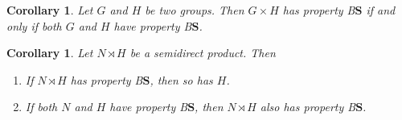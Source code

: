 \documentclass[a4paper]{article}
\newcommand{\PH}[1]{\todo[color={blue!33},size=small]{#1}}
\newtheorem{cor}[lem]{Corollary}
\theoremstyle{definition}
\newcommand*{\BS}{B$\mathbf{S}$}
\begin{document}
%
%
%
%
%
%
\begin{cor}\label{Cor:Prod}
Let $G$ and $H$ be two groups. Then $G\times H$ has property \BS{} if and only if both $G$ and $H$ have property \BS.
\end{cor}
%
%
\begin{cor}\label{Cor:Semidirect}
Let $N\rtimes H$ be a semidirect product. Then
\begin{enumerate}
\item
If $N\rtimes H$ has property \BS, then so has $H$.
\item
If both $N$ and $H$ have property \BS, then $N\rtimes H$ also has property \BS.
\end{enumerate}
\end{cor}
%
\end{document}
